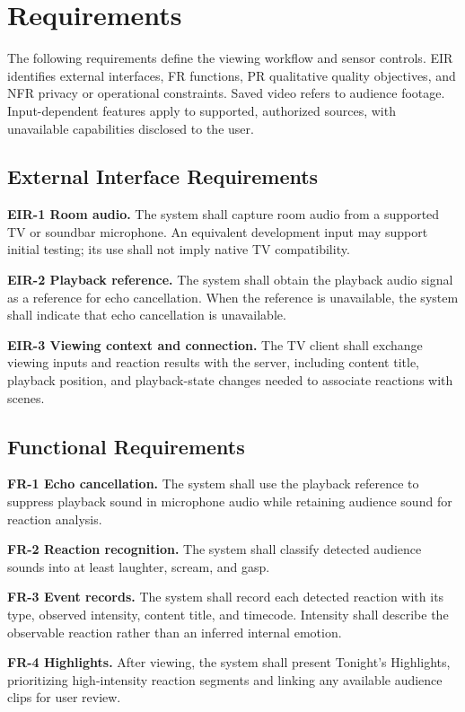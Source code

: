 \section{Requirements}

The following requirements define the viewing workflow and sensor controls. EIR identifies external interfaces, FR functions, PR qualitative quality objectives, and NFR privacy or operational constraints. Saved video refers to audience footage. Input-dependent features apply to supported, authorized sources, with unavailable capabilities disclosed to the user.

\subsection{External Interface Requirements}

\textbf{EIR-1 Room audio.} The system shall capture room audio from a supported TV or soundbar microphone. An equivalent development input may support initial testing; its use shall not imply native TV compatibility.

\textbf{EIR-2 Playback reference.} The system shall obtain the playback audio signal as a reference for echo cancellation. When the reference is unavailable, the system shall indicate that echo cancellation is unavailable.

\textbf{EIR-3 Viewing context and connection.} The TV client shall exchange viewing inputs and reaction results with the server, including content title, playback position, and playback-state changes needed to associate reactions with scenes.

\subsection{Functional Requirements}

\textbf{FR-1 Echo cancellation.} The system shall use the playback reference to suppress playback sound in microphone audio while retaining audience sound for reaction analysis.

\textbf{FR-2 Reaction recognition.} The system shall classify detected audience sounds into at least laughter, scream, and gasp.

\textbf{FR-3 Event records.} The system shall record each detected reaction with its type, observed intensity, content title, and timecode. Intensity shall describe the observable reaction rather than an inferred internal emotion.

\textbf{FR-4 Highlights.} After viewing, the system shall present Tonight's Highlights, prioritizing high-intensity reaction segments and linking any available audience clips for user review.

